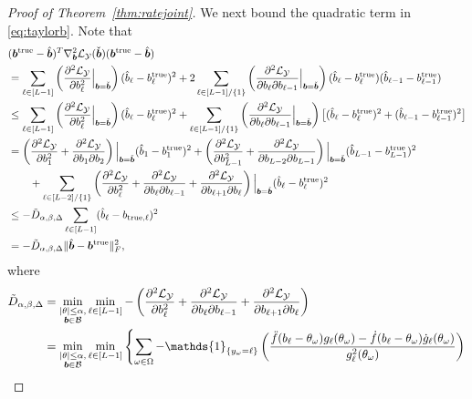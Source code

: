 \documentclass[11pt]{article}
\theoremstyle{plain}
\theoremstyle{definition}
\begin{document}
\begin{proof}[Proof of Theorem~\ref{thm:ratejoint}]
We next bound the quadratic term in \eqref{eq:taylorb}. Note that
\begin{align}\label{eq:quadraticb}
 &(\bm{b}^{\mathrm{true}}-\hat{\bm{b}})^T \nabla^2_{\bm{b}}\mathcal{L}_{\mathcal{Y}}(\check{\bm{b}})(\bm{b}^{\mathrm{true}}-\hat{\bm{b}})\\
 &=\sum_{\ell\in [L-1]} \left( {\partial^2\mathcal{L}_{\mathcal{Y}}\over \partial b^2_\ell} \Big|_{\bm{b}=\check{\bm{b}}} \right)(\hat b_\ell-b^{\text{true}}_{\ell})^2 + 2\sum_{\ell\in[L-1]/\{1\}}\left( {\partial^2\mathcal{L}_{\mathcal{Y}}\over \partial b_\ell \partial b_{\ell-1}} \Big|_{\bm{b}=\check{\bm{b}}} \right)(\hat b_\ell-b^{\text{true}}_{\ell})(\hat b_{\ell-1}-b^{\text{true}}_{\ell-1}) \nonumber \\
&\leq \sum_{\ell\in [L-1]} \left( {\partial^2\mathcal{L}_{\mathcal{Y}}\over \partial b^2_\ell} \Big|_{\bm{b}=\check{\bm{b}}} \right)(\hat b_\ell-b^{\text{true}}_{\ell})^2 + \sum_{\ell\in[L-1]/\{1\}}\left( {\partial^2\mathcal{L}_{\mathcal{Y}}\over \partial b_\ell \partial b_{\ell-1}} \Big|_{\bm{b}=\check{\bm{b}}} \right)\big[(\hat b_\ell-b^{\text{true}}_{\ell})^2 +(\hat b_{\ell-1}-b^{\text{true}}_{\ell-1})^2\big] \nonumber \\
&=\left( {\partial^2\mathcal{L}_{\mathcal{Y}}\over \partial b^2_1}+{\partial^2\mathcal{L}_{\mathcal{Y}}\over \partial b_1 \partial b_2 }\right)\Big|_{\bm{b}=\check{\bm{b}}}(\hat b_1-b^{\text{true}}_{1})^2+\left( {\partial^2\mathcal{L}_{\mathcal{Y}}\over \partial b^2_{L-1}}+{\partial^2\mathcal{L}_{\mathcal{Y}}\over \partial b_{L-2} \partial b_{L-1} }\right)\Big|_{\bm{b}=\check{\bm{b}}}(\hat b_{L-1}-b^{\text{true}}_{L-1})^2  \\
&\quad\quad +\sum_{\ell\in[L-2]/\{1\}}\left( {\partial^2\mathcal{L}_{\mathcal{Y}}\over \partial b^2_\ell}+{\partial^2\mathcal{L}_{\mathcal{Y}}\over \partial b_\ell \partial b_{\ell-1}}+{\partial^2\mathcal{L}_{\mathcal{Y}}\over \partial b_{\ell+1} \partial b_{\ell}} \right)\Big|_{\bm{b}=\check{\bm{b}}} (\hat b_\ell-b^{\text{true}}_{\ell})^2     \\
&\leq - \tilde{D}_{\alpha,\beta,\Delta} \sum_{\ell \in [L-1]}(\hat b_\ell-b_{\text{true},\ell})^2 \nonumber \\
&=-\tilde{D}_{\alpha,\beta,\Delta}\lVert\hat{\bm{b}}-\bm{b}^{\mathrm{true}}\rVert_F^2,
\end{align}
where
\begin{align}
\tilde{D}_{\alpha,\beta,\Delta}&=\min_{\substack{|\theta|\leq \alpha,\\ \mb\in\tB}}\min_{\ell\in[L-1]} -\left( {\partial^2\tL_{\tY}\over \partial b^2_\ell}+{\partial^2\tL_{\tY}\over \partial b_\ell \partial b_{\ell-1}}+{\partial^2\tL_{\tY}\over \partial b_{\ell+1} \partial b_{\ell}} \right)\\
&=\min_{\substack{|\theta|\leq \alpha,\\ \mb\in\tB}} \min_{\ell\in[L-1]}\left\{\sum_{\omega\in\Omega}-\mathds{1}_{\{y_\omega=\ell\}}\left( {\ddot{f}(b_{\ell}-\theta_\omega) g_\ell(\theta_\omega)- \dot{f}(b_{\ell}-\theta_\omega)\dot{g}_\ell(\theta_\omega) \over g^2_\ell(\theta_\omega) }\right)\right. \\

\end{align}
\end{proof}
\end{document}
